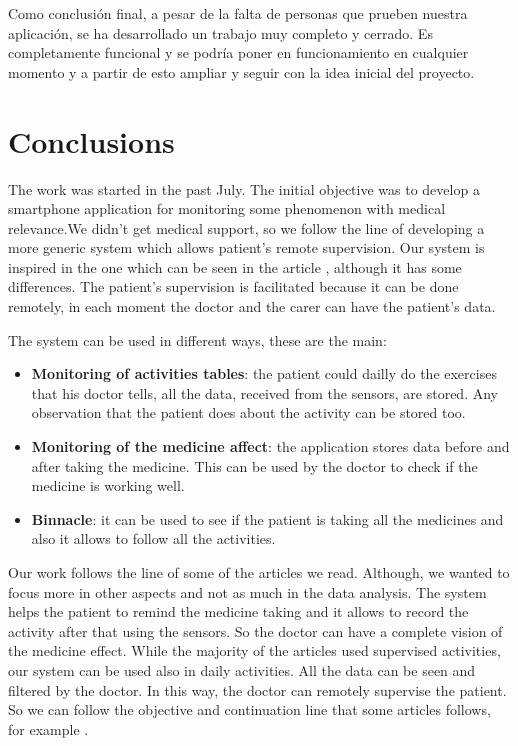 \documentclass[11pt,spanish]{article}
\begin{document}
Como conclusión final, a pesar de la falta de personas que prueben nuestra aplicación, se ha desarrollado un trabajo muy completo y cerrado. Es completamente funcional y se podría poner en funcionamiento en cualquier momento y a partir de esto ampliar y seguir con la idea inicial del proyecto.
\newpage

\section{Conclusions}

The work was started in the past July. The initial objective was to develop a smartphone application for monitoring some phenomenon with medical relevance.We didn’t get medical support, so we follow the line of developing a more generic system which allows patient’s remote supervision. Our system is inspired in the one which can be seen in the article \cite{resumen1}, although it has some differences. The patient’s supervision is facilitated because it can be done remotely, in each moment the doctor and the carer can have the patient’s data.
\newline

The system can be used in different ways, these are the main:

\begin{itemize}
	\item {\bf Monitoring of activities tables}: the patient could dailly do the exercises that his doctor tells, all the data, received from the sensors, are stored. Any observation that the patient does about the activity can be stored too.
	\item {\bf Monitoring of the medicine affect}: the application stores data before and after taking the medicine. This can be used by the doctor to check if the medicine is working well.
	\item {\bf Binnacle}: it can be used to see if the patient is taking all the medicines and also it allows to follow all the activities. 
\end{itemize}

Our work follows the line of some of the articles we read. Although, we wanted to focus more in other aspects and not as much in the data analysis. The system helps the patient to remind the medicine taking and it allows to record the activity after that using the sensors. So the doctor can have a complete vision of the medicine effect. While the majority of the articles used supervised activities, our system can be used also in daily activities. All the data can be seen and filtered by the doctor. In this way, the doctor can remotely supervise the patient. So we can follow the objective and continuation line that some articles follows, for example \cite {resumen2}.
\newline
\end{document}
